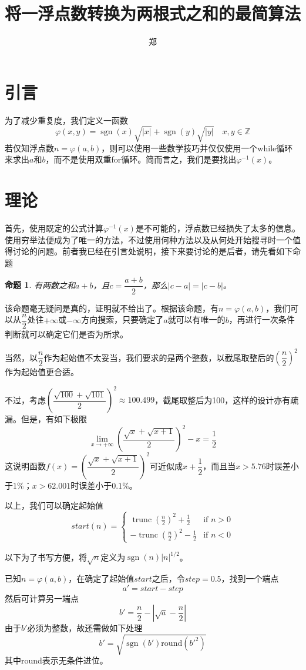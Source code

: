 \documentclass[a4paper, UTF8]{ctexart}
\title{将一浮点数转换为两根式之和的最简算法}
\author{郑}
\newtheorem{proposition}{命题}
\DeclareMathOperator{\sgn}{\mathrm{sgn}}
\DeclareMathOperator{\trunc}{\mathrm{trunc}}
\begin{document}
\maketitle

\section{引言}
为了减少重复度，我们定义一函数\[\varphi(x,y)=\sgn(x)\sqrt{|x|}+\sgn(y)\sqrt{|y|} \quad x,y\in\mathbb{Z}\]若仅知浮点数$n=\varphi(a,b)$，则可以使用一些数学技巧并仅仅使用一个while循环来求出$a$和$b$，而不是使用双重for循环。简而言之，我们是要找出$\varphi^{-1}(x)$。

\section{理论}
首先，使用既定的公式计算$\varphi^{-1}(x)$是不可能的，浮点数已经损失了太多的信息。使用穷举法便成为了唯一的方法，不过使用何种方法以及从何处开始搜寻时一个值得讨论的问题。前者我已经在引言处说明，接下来要讨论的是后者，请先看如下命题
\begin{proposition}
    有两数之和$a+b$，且$c=\dfrac{a+b}{2}$，那么$|c-a|=|c-b|$。
\end{proposition}
该命题毫无疑问是真的，证明就不给出了。根据该命题，有$n=\varphi(a,b)$，我们可以从$\dfrac{n}{2}$处往$+\infty$或$-\infty$方向搜索，只要确定了$a$就可以有唯一的$b$，再进行一次条件判断就可以确定它们是否为所求。

当然，以$\dfrac{n}{2}$作为起始值不太妥当，我们要求的是两个整数，以截尾取整后的$\left(\dfrac{n}{2}\right)^2$作为起始值更合适。

不过，考虑$\left(\dfrac{\sqrt{100}+\sqrt{101}}{2}\right)^2\approx100.499$，截尾取整后为100，这样的设计亦有疏漏。但是，有如下极限\[\lim_{x\to+\infty} \left(\frac{\sqrt{x}+\sqrt{x+1}}{2}\right)^2-x=\frac{1}{2}\]这说明函数$f(x)=\left(\dfrac{\sqrt{x}+\sqrt{x+1}}{2}\right)^2$可近似成$x+\dfrac{1}{2}$，而且当$x>5.76$时误差小于$1\%$；$x>62.001$时误差小于$0.1\%$。

以上，我们可以确定起始值
\[
    start(n)=
    \begin{cases}
        \trunc(\frac{n}{2})^2+\frac{1}{2} & \text{if }n>0 \\
        -\trunc(\frac{n}{2})^2-\frac{1}{2} & \text{if }n<0
    \end{cases}
\]

以下为了书写方便，将$\sqrt{n}$定义为$\sgn(n)|n|^{1/2}$。

已知$n=\varphi(a,b)$，在确定了起始值$start$之后，令$step=0.5$，找到一个端点\[a'=start-step\]然后可计算另一端点\[b'=\frac{n}{2}-|\sqrt{a}-\frac{n}{2}|\]由于$b'$必须为整数，故还需做如下处理\[b'=\sqrt{\sgn(b')\mathrm{round}(b'^2)}\]其中round表示无条件进位。
\end{document}
